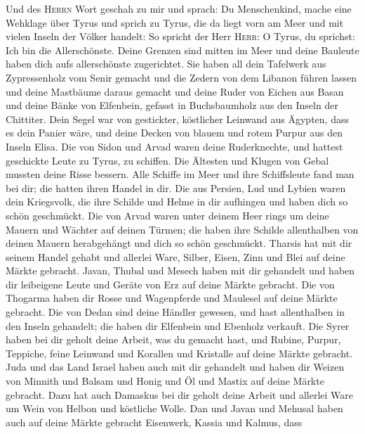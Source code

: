  Und des \textsc{Herrn} Wort geschah zu mir und sprach:
 Du Menschenkind, mache eine Wehklage über Tyrus
 und sprich zu Tyrus, die da liegt vorn am Meer und mit
vielen Inseln der Völker handelt: So spricht der Herr \textsc{Herr}: O
Tyrus, du sprichst: Ich bin die Allerschönste.  Deine
Grenzen sind mitten im Meer und deine Bauleute haben dich aufs
allerschönste zugerichtet.  Sie haben all dein Tafelwerk
aus Zypressenholz vom Senir gemacht und die Zedern von dem Libanon
führen lassen und deine Mastbäume daraus gemacht  und
deine Ruder von Eichen aus Basan und deine Bänke von Elfenbein, gefasst
in Buchsbaumholz aus den Inseln der Chittiter.  Dein Segel
war von gestickter, köstlicher Leinwand aus Ägypten, dass es dein Panier
wäre, und deine Decken von blauem und rotem Purpur aus den Inseln Elisa.
 Die von Sidon und Arvad waren deine Ruderknechte, und
hattest geschickte Leute zu Tyrus, zu schiffen.  Die
Ältesten und Klugen von Gebal mussten deine Risse bessern. Alle Schiffe
im Meer und ihre Schiffsleute fand man bei dir; die hatten ihren Handel
in dir.  Die aus Persien, Lud und Lybien waren dein
Kriegsvolk, die ihre Schilde und Helme in dir aufhingen und haben dich
so schön geschmückt.  Die von Arvad waren unter deinem
Heer rings um deine Mauern und Wächter auf deinen Türmen; die haben ihre
Schilde allenthalben von deinen Mauern herabgehängt und dich so schön
geschmückt.  Tharsis hat mit dir seinem Handel gehabt und
allerlei Ware, Silber, Eisen, Zinn und Blei auf deine Märkte gebracht.
 Javan, Thubal und Mesech haben mit dir gehandelt und
haben dir leibeigene Leute und Geräte von Erz auf deine Märkte gebracht.
 Die von Thogarma haben dir Rosse und Wagenpferde und
Maulesel auf deine Märkte gebracht.  Die von Dedan sind
deine Händler gewesen, und hast allenthalben in den Inseln gehandelt;
die haben dir Elfenbein und Ebenholz verkauft.  Die Syrer
haben bei dir geholt deine Arbeit, was du gemacht hast, und Rubine,
Purpur, Teppiche, feine Leinwand und Korallen und Kristalle auf deine
Märkte gebracht.  Juda und das Land Israel haben auch mit
dir gehandelt und haben dir Weizen von Minnith und Balsam und Honig und
Öl und Mastix auf deine Märkte gebracht.  Dazu hat auch
Damaskus bei dir geholt deine Arbeit und allerlei Ware um Wein von
Helbon und köstliche Wolle.  Dan und Javan und Mehusal
haben auch auf deine Märkte gebracht Eisenwerk, Kassia und Kalmus, dass
